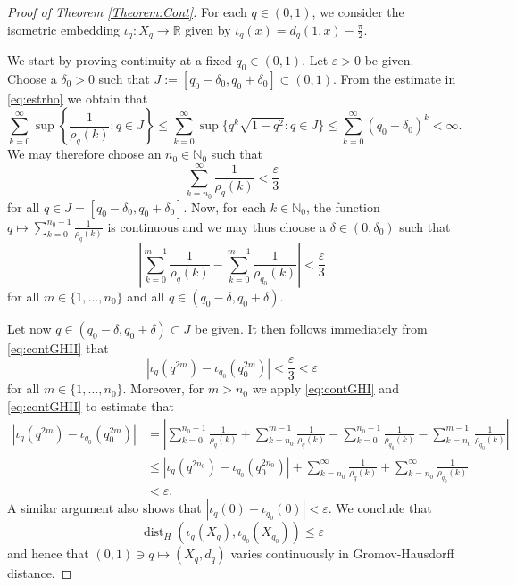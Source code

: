 \documentclass[11pt, reqno, a4paper, final]{amsart}
\theoremstyle{plain}
\theoremstyle{definition}
\newcommand{\NN}{{\mathbb N}}
\newcommand{\RR}{{\mathbb R}}
\newcommand{\varps}{{\varepsilon}}
\renewcommand{\leq}{\leqslant}
\newcommand{\black}{\color{black}}
\renewcommand{\epsilon}{{\varepsilon}}
\begin{document}
\begin{proof}[Proof of Theorem \ref{Theorem:Cont}]
For each $q \in (0,1)$, we consider the isometric embedding $\iota_q\colon X_q \to \RR$ given by $\iota_q(x)=d_q(1,x)-\tfrac{\pi}{2}$. 

{\black We start by proving continuity at a fixed $q_0\in (0,1)$. Let $\varps>0$ be given. Choose a $\delta_0 > 0$ such that $J := [q_0 - \delta_0, q_0 + \delta_0] \subset (0,1)$. From the estimate in \eqref{eq:estrho} we obtain that
\[
\sum_{k = 0}^\infty \sup \left\lbrace \frac{1}{\rho_q(k)} : q \in J \right\rbrace  
\leq \sum_{k = 0}^\infty \sup \lbrace q^k \sqrt{1 - q^2} : q \in J \rbrace  
\leq \sum_{k = 0}^\infty (q_0 + \delta_0)^k < \infty .
\]
We may therefore choose an $n_0 \in \NN_0$ such that
\begin{equation}\label{eq:contGHI}
\sum_{k=n_0}^{\infty} \frac{1}{\rho_q(k)}< \frac{\varps}{3}
\end{equation}
for all $q \in J = [q_0 - \delta_0, q_0 + \delta_0]$. Now, for each $k \in \NN_0$, the function $q \mapsto \sum_{k = 0}^{n_0 - 1}\frac{1}{\rho_q(k)}$ is continuous and we may thus choose a $\delta \in (0,\delta_0)$ such that 
\begin{equation}\label{eq:contGHII}
\left|\sum_{k=0}^{m-1} \frac{1}{\rho_q(k)} -  \sum_{k=0}^{m-1} \frac{1}{\rho_{q_0}(k)}\right|< \frac{\varps}{3} 
\end{equation}
for all $m \in \{1,\ldots,n_0\}$ and all $q \in (q_0 - \delta,q_0 + \delta)$.}

Let now $q \in (q_0 - \delta,q_0 + \delta) \subset J$ be given. It then follows immediately from \eqref{eq:contGHII} that 
\[
|\iota_q(q^{2m}) - \iota_{q_0}(q_0^{2m})| < \frac{\varps}{3} < \varps
\]
for all $m \in \{1,\dots, n_0\}$. Moreover, for $m > n_0$ we apply \eqref{eq:contGHI} and \eqref{eq:contGHII} to estimate that
\[
\begin{split}
|\iota_q(q^{2m})- \iota_{q_0}(q_0^{2m})| &= \left| \sum_{k=0}^{n_0-1}\frac{1}{\rho_q(k)} +\sum_{k=n_0}^{m-1} \frac{1}{\rho_q(k)} - \sum_{k=0}^{n_0-1}\frac{1}{\rho_{q_0}(k)} - \sum_{k=n_0}^{m-1} \frac{1}{\rho_{q_0}(k)} \right| \\
&\leq | \iota_q( q^{2n_0}) - \iota_{q_0}(q_0^{2n_0}) | 
+ \sum_{k=n_0}^{\infty} \frac{1}{\rho_q(k)} + \sum_{k=n_0}^{\infty} \frac{1}{\rho_{q_0}(k)}\\
&<  \varps .
\end{split}
\]
{\black A similar argument also shows that $|\iota_q(0) - \iota_{q_0}(0)| < \varps$. We conclude that 
\[
\operatorname{dist}_H(\iota_q(X_q),\iota_{q_0}(X_{q_0})) \leq \epsilon
\]
and hence that $(0,1) \ni q \mapsto (X_q,d_q)$ varies continuously in Gromov-Hausdorff distance.}


\end{proof}
\end{document}

